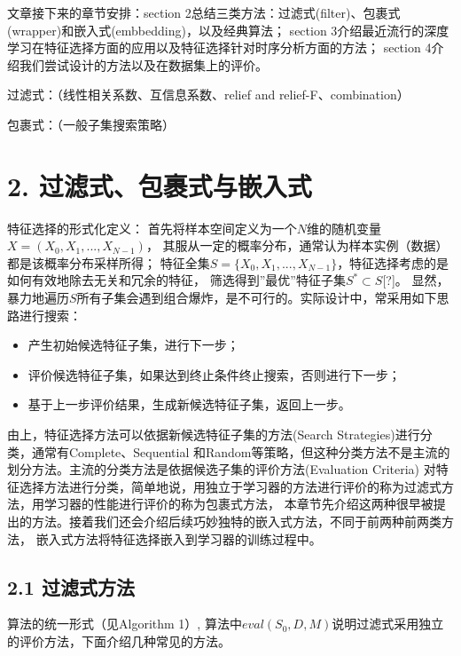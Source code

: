\documentclass[a4paper,UTF8]{article}
\begin{document}
  文章接下来的章节安排：section 2总结三类方法：过滤式(filter)、包裹式(wrapper)和嵌入式(embbedding)，以及经典算法；
  section 3介绍最近流行的深度学习在特征选择方面的应用以及特征选择针对时序分析方面的方法；
  section 4介绍我们尝试设计的方法以及在数据集上的评价。

  过滤式：（线性相关系数、互信息系数、relief and relief-F、combination）

  包裹式：（一般子集搜索策略）





\section*{2. 过滤式、包裹式与嵌入式}
  特征选择的形式化定义：
  首先将样本空间定义为一个$ N $维的随机变量$ X = (X_{0}, X_{1}, ... , X_{N-1})$，
  其服从一定的概率分布，通常认为样本实例（数据）都是该概率分布采样所得；
  特征全集$ S = \{X_{0}, X_{1}, ... , X_{N-1}\} $，特征选择考虑的是如何有效地除去无关和冗余的特征，
  筛选得到”最优”特征子集$ S^{*} \subset S $[?]。
  显然，暴力地遍历$ S $所有子集会遇到组合爆炸，是不可行的。实际设计中，常采用如下思路进行搜索：

  \begin{itemize}

    \item 产生初始候选特征子集，进行下一步；
    \item 评价候选特征子集，如果达到终止条件终止搜索，否则进行下一步；
    \item 基于上一步评价结果，生成新候选特征子集，返回上一步。

  \end{itemize}
  由上，特征选择方法可以依据新候选特征子集的方法(Search Strategies)进行分类，通常有Complete、Sequential
  和Random等策略，但这种分类方法不是主流的划分方法。主流的分类方法是依据候选子集的评价方法(Evaluation Criteria)
  对特征选择方法进行分类，简单地说，用独立于学习器的方法进行评价的称为过滤式方法，用学习器的性能进行评价的称为包裹式方法，
  本章节先介绍这两种很早被提出的方法。接着我们还会介绍后续巧妙独特的嵌入式方法，不同于前两种前两类方法，
  嵌入式方法将特征选择嵌入到学习器的训练过程中。


\subsection*{2.1 过滤式方法}
  算法的统一形式（见Algorithm 1）,  算法中$ eval(S_{0}, D, M)$说明过滤式采用独立的评价方法，下面介绍几种常见的方法。
\end{document}
